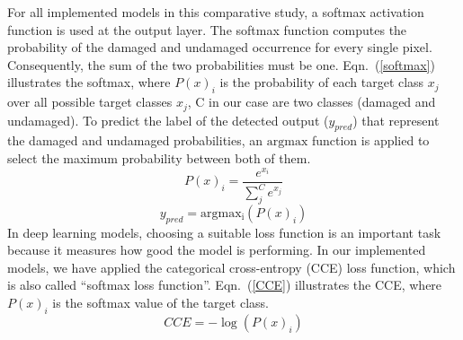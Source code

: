 \documentclass[runningheads]{llncs}
\begin{document}
For all implemented models in this comparative study, a softmax activation function is used at the output layer.
The softmax function computes the probability of the damaged and undamaged occurrence for every single pixel.
Consequently, the sum of the two probabilities must be one. 
Eqn.~(\ref{softmax}) illustrates the softmax, where \(P(x)_{i}\) is the probability of each target class \(x_{j}\) over all possible target classes \(x_{j}\), C in our case are two classes  (damaged and undamaged).
To predict the label of the detected output (\(y_{pred}\)) that represent the damaged and undamaged probabilities, an \(\mathrm{argmax}\) function is applied to select the maximum probability between both of them.
\begin{equation}
	P(x)_{i} = \frac{e^{x_{i}}}{\sum_{j}^{C} e^{x_{j}}}
	\label{softmax}
\end{equation} 
\begin{equation}
	y_{pred} = \mathrm{argmax_{i}}\left( P(x)_{i} \right)
	\label{argmax}
\end{equation}
In deep learning models, choosing a suitable loss function is an important task because it measures how good the model is performing.
In our implemented models, we have applied the categorical cross-entropy (CCE) loss function, which is also called \enquote{softmax loss function}.
Eqn.~(\ref{CCE}) illustrates the CCE, where \( P(x)_{i}\) is the softmax value of the target class. 
\begin{equation}
	CCE = -\log\left( P(x)_{i} \right)
	\label{CCE}
\end{equation}
\end{document}
